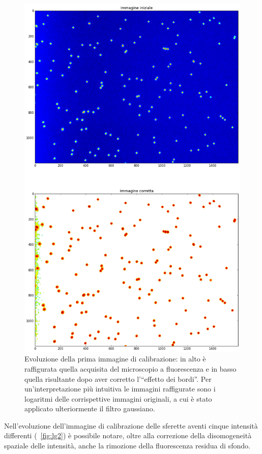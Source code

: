 \begin{figure}
 \centering
 \includegraphics[scale=.40]{img/CAP4lg1.png}
 \caption{\small{Evoluzione della prima immagine di calibrazione: in alto è raffigurata quella acquisita del microscopio a fluorescenza e in basso quella risultante dopo aver corretto l'``effetto dei bordi''. Per un'interpretazione più intuitiva le immagini raffigurate sono i logaritmi delle corrispettive immagini originali, a cui è stato applicato ulteriormente il filtro gaussiano.}}
 \label{fig:lg1}
\end{figure}

Nell'evoluzione dell'immagine di calibrazione delle sferette aventi cinque intensità differenti (\figurename~\ref{fig:lg2}) è possibile notare, oltre alla correzione della disomogeneità spaziale delle intensità, anche la rimozione della fluorescenza residua di sfondo.

